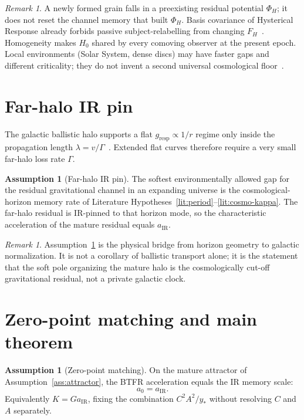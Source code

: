 \documentclass[11pt]{article}
\theoremstyle{definition}
\newtheorem{assumption}[theorem]{Assumption}
\theoremstyle{remark}
\newtheorem{remark}[theorem]{Remark}
\newcommand{\FH}{F_H}
\begin{document}
\begin{remark}
A newly formed grain falls in a preexisting residual potential $\Phi_H$; it does not reset
the channel memory that built $\Phi_H$.
Basis covariance of Hysterical Response already forbids passive subject-relabelling from
changing $\FH$~\cite{boyd2026response}.
Homogeneity makes $H_0$ shared by every comoving observer at the present epoch.
Local environments (Solar System, dense discs) may have faster gaps and different criticality;
they do not invent a second universal cosmological floor~\cite{boyd2026late}.
\end{remark}

\section{Far-halo IR pin}
\label{sec:pin}
The galactic ballistic halo supports a flat $g_{\mathrm{resp}}\propto1/r$ regime only inside
the propagation length $\lambda=v/\Gamma$~\cite{boyd2026galactic}.
Extended flat curves therefore require a very small far-halo loss rate $\Gamma$.

\begin{assumption}[Far-halo IR pin]
\label{ass:halo-IR}
The softest environmentally allowed gap for the residual gravitational channel in an
expanding universe is the cosmological-horizon memory rate of Literature
Hypotheses~\ref{lit:period}--\ref{lit:cosmo-kappa}.
The far-halo residual is IR-pinned to that horizon mode, so the characteristic acceleration
of the mature residual equals $a_{\mathrm{IR}}$.
\end{assumption}

\begin{remark}
Assumption~\ref{ass:halo-IR} is the physical bridge from horizon geometry to galactic
normalization.
It is not a corollary of ballistic transport alone; it is the statement that the soft pole
organizing the mature halo is the cosmologically cut-off gravitational residual, not a
private galactic clock.
\end{remark}

\section{Zero-point matching and main theorem}
\label{sec:main}
\begin{assumption}[Zero-point matching]
\label{ass:zero-match}
On the mature attractor of Assumption~\ref{ass:attractor}, the BTFR acceleration equals the
IR memory scale:
\begin{equation}
\label{eq:match}
a_0=a_{\mathrm{IR}}.
\end{equation}
Equivalently $K=Ga_{\mathrm{IR}}$, fixing the combination $C^{2}A^{2}/y_{\ast}$ without resolving
$C$ and $A$ separately.
\end{assumption}
\end{document}
